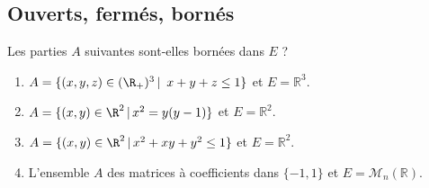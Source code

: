 \documentclass[a4paper,twoside,french,11pt]{VcCours}
\begin{document}


\subsection{Ouverts, fermés, bornés}




\begin{Exercice}{} Les parties $A$ suivantes sont-elles bornées dans $E$ ?

\begin{enumerate}
\item $A= \lbrace (x,y,z)\in (\R_+)^3 \, \vert \,  \ x+y+z\leq 1\rbrace$ et $E= \mathbb{R}^3$.
\item $A = \lbrace (x,y)\in\R^2 \, \vert \, x^2=y(y-1) \rbrace$ et $E= \mathbb{R}^2$.
\item $A = \lbrace (x,y)\in\R^2 \, \vert \, x^2+xy+y^2\leq1 \rbrace$ et $E= \mathbb{R}^2$.
\item L'ensemble $A$ des matrices à coefficients dans $\lbrace -1,1 \rbrace$ et $E = \mathcal{M}_n(\mathbb{R})$.
\end{enumerate}
\end{Exercice}
\end{document}
